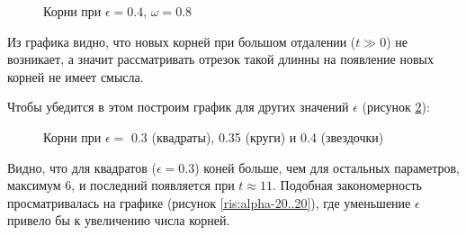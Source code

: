 \documentclass[14pt, a4paper]{article}
\numberwithin{figure}{section}
\numberwithin{equation}{section}
\begin{document}
\begin{figure}[h]
	\caption{Корни при $\epsilon = 0.4$, $\omega = 0.8$}
	\label{ris:roots1}
\end{figure}

Из графика видно, что новых корней при большом отдалении ($t\gg0$) не возникает, а значит рассматривать отрезок такой длинны на появление новых корней не имеет смысла.

Чтобы убедится в этом построим график для других значений $\epsilon$ (рисунок \ref{ris:roots2}):

\begin{figure}[h]
	\caption{Корни при $\epsilon = $ 0.3 (квадраты), 0.35 (круги) и 0.4 (звездочки) }
	\label{ris:roots2}
\end{figure}

Видно, что для квадратов ($\epsilon = 0.3$) коней больше, чем для остальных параметров, максимум 6, и последний появляется при $t \approx 11$. Подобная закономерность просматривалась на графике (рисунок \ref{ris:alpha-20..20}), где уменьшение $\epsilon$ привело бы к увеличению числа корней.
\end{document}
